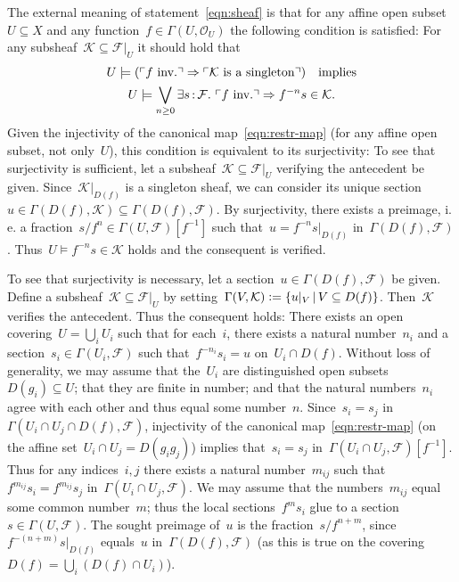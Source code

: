 \documentclass[10pt,reqno,a4paper]{amsbook}
\makeatletter
\theoremstyle{definition}
\theoremstyle{plain}
\theoremstyle{remark}
\newcommand{\F}{\mathcal{F}}
\renewcommand{\O}{\mathcal{O}}
\newcommand{\K}{\mathcal{K}}
\newcommand{\?}{\,{:}\,}
\renewcommand{\_}{\mathpunct{.}\,}
\newcommand{\speak}[1]{\ulcorner\text{\textnormal{#1}}\urcorner}
\newcommand{\ie}{i.\,e.\@\xspace}
\newcommand{\inv}{inv.\@}
\newcommand{\defeq}{\vcentcolon=}
\renewenvironment{proof}[1][\proofname]{\par
  \pushQED{\qed}%
  \normalfont \topsep6\p@\@plus6\p@\relax
  \trivlist
  \item[\hskip\labelsep
        \itshape
    #1\@addpunct{.}]\ignorespaces
}{%
  \popQED\endtrivlist\@endpefalse
}
\makeatother
\begin{document}
\begin{proof}[Proof of Theorem~\ref{thm:qcoh-sheafchar}]
The external meaning of statement~\eqref{eqn:sheaf} is that for any affine open
subset~$U \subseteq X$ and any function~$f \in \Gamma(U,\O_U)$ the following
condition is satisfied: For any subsheaf~$\K \subseteq \F|_U$ it should hold
that
\begin{multline*}
  U \models (\speak{$f$ \inv} \Rightarrow \speak{$\K$ is a singleton})
  \quad\text{implies} \\
  U \models \bigvee_{n \geq 0} \exists s\?\F\_
  \speak{$f$ \inv} \Rightarrow f^{-n} s \in \K.
\end{multline*}
Given the injectivity of the canonical map~\eqref{eqn:restr-map} (for any
affine open subset, not only~$U$), this condition is equivalent to its
surjectivity: To see that surjectivity is sufficient, let a subsheaf~$\K
\subseteq \F|_U$ verifying the antecedent be given. Since~$\K|_{D(f)}$ is a
singleton sheaf, we can consider its unique section~$u \in \Gamma(D(f),\K)
\subseteq \Gamma(D(f),\F)$. By surjectivity, there exists a preimage, \ie a
fraction~$s/f^n \in \Gamma(U,\F)[f^{-1}]$ such that~$u = f^{-n} s|_{D(f)}$
in~$\Gamma(D(f),\F)$. Thus~$U \models f^{-n}s \in \K$ holds and the consequent
is verified.

To see that surjectivity is necessary, let a section~$u \in \Gamma(D(f),\F)$ be
given. Define a subsheaf~$\K \subseteq \F|_U$ by setting~$\Gamma(V,\K) \defeq \{
u|_V \,|\, V \subseteq D(f) \}$. Then~$\K$ verifies the antecedent. Thus the
consequent holds: There exists an open covering~$U = \bigcup_i U_i$ such that
for each~$i$, there exists a natural number~$n_i$ and a section~$s_i \in
\Gamma(U_i,\F)$ such that~$f^{-n_i} s_i = u$ on~$U_i \cap D(f)$. Without loss of
generality, we may assume that the~$U_i$ are distinguished open subsets~$D(g_i)
\subseteq U$; that they are finite in number; and that the natural
numbers~$n_i$ agree with each other and thus equal some number~$n$. Since~$s_i
= s_j$ in~$\Gamma(U_i \cap U_j \cap D(f), \F)$, injectivity of the canonical
map~\eqref{eqn:restr-map} (on the affine set~$U_i \cap U_j = D(g_i g_j)$)
implies that~$s_i = s_j$ in~$\Gamma(U_i \cap U_j, \F)[f^{-1}]$. Thus for
any indices~$i,j$ there exists a natural number~$m_{ij}$ such that~$f^{m_{ij}} s_i =
f^{m_{ij}} s_j$ in~$\Gamma(U_i \cap U_j, \F)$. We may assume that the
numbers~$m_{ij}$ equal some common number~$m$; thus the local sections~$f^m s_i$
glue to a section~$s \in \Gamma(U,\F)$. The sought preimage of~$u$ is the
fraction~$s/f^{n+m}$, since~$f^{-(n+m)} s|_{D(f)}$ equals~$u$
in~$\Gamma(D(f),\F)$ (as this is true on the covering~$D(f) = \bigcup_i (D(f)
\cap U_i)$).
\end{proof}
\end{document}
